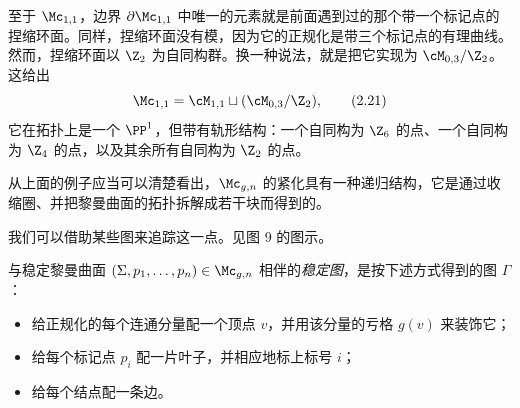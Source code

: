 
至于 $\Mc_{1,1}$，边界 $\partial\Mc_{1,1}$ 中唯一的元素就是前面遇到过的那个带一个标记点的捏缩环面。同样，捏缩环面没有模，因为它的正规化是带三个标记点的有理曲线。然而，捏缩环面以 $\Z_2$ 为自同构群。换一种说法，就是把它实现为 $\cM_{0,3}/\Z_2$。这给出
\begin{equation}
  \Mc_{1,1}=\cM_{1,1}\sqcup(\cM_{0,3}/\Z_2),
  \tag{2.21}
\end{equation}
它在拓扑上是一个 $\PP^1$，但带有轨形结构：一个自同构为 $\Z_6$ 的点、一个自同构为 $\Z_4$ 的点，以及其余所有自同构为 $\Z_2$ 的点。


从上面的例子应当可以清楚看出，$\Mc_{g,n}$ 的紧化具有一种递归结构，它是通过收缩圈、并把黎曼曲面的拓扑拆解成若干块而得到的。



我们可以借助某些图来追踪这一点。见图 9 的图示。


\begin{definition}[2.5]
  与稳定黎曼曲面 $(\Sigma,p_1,\dots,p_n)\in\Mc_{g,n}$ 相伴的\emph{稳定图}，是按下述方式得到的图 $\Gamma$：
  \begin{itemize}
    \item 给正规化的每个连通分量配一个顶点 $v$，并用该分量的亏格 $g(v)$ 来装饰它；
    \item 给每个标记点 $p_i$ 配一片叶子，并相应地标上标号 $i$；
    \item 给每个结点配一条边。
  \end{itemize}
\end{definition}


